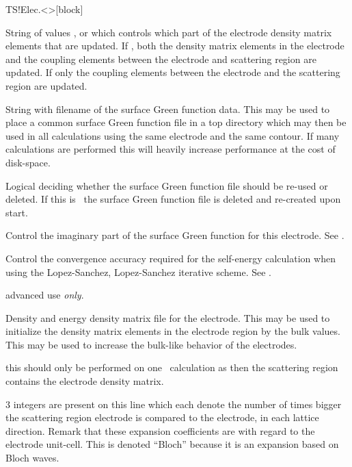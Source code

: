 \begin{fdfentry}{TS!Elec.<>}[block]
\begin{fdfoptions}
    \option[DM-update]%
    String of values ,  or 
    which controls which part of the electrode density matrix elements
    that are updated. If , both the density matrix elements
    in the electrode and the coupling elements between the 
    electrode and scattering region are updated. If 
    only the coupling elements between the electrode and the
    scattering region are updated.

    \option[Gf]%
    String with filename of the surface Green function data. This may
    be used to place a common surface Green function file in a top
    directory which may then be used in all calculations using the
    same electrode and the same contour. 
    If many calculations are performed this will heavily increase
    performance at the cost of disk-space.

    \option[Gf-Reuse]%
    Logical deciding whether the surface Green function file should be
    re-used or deleted.
    If this is \fdffalse\ the surface Green function file is deleted
    and re-created upon start.
    
    \option[Eta]%
    Control the imaginary part of the surface Green function for this
    electrode. See .

    \option[Accuracy]%
    Control the convergence accuracy required for the self-energy
    calculation when using the Lopez-Sanchez, Lopez-Sanchez iterative
    scheme. 
    See .

    \note advanced use \emph{only}.
    
    \option[DE]%
    Density and energy density matrix file for the electrode. This may
    be used to initialize the density matrix elements in the electrode
    region by the bulk values. This may be used to increase the
    bulk-like behavior of the electrodes. 

    \note this should only be performed on one \tsiesta\ calculation
    as then the scattering region  contains the
    electrode density matrix.

    \option[Bloch]%
    $3$ integers are present on this line which each denote the number
    of times bigger the scattering region electrode is compared to the
    electrode, in each lattice direction. Remark that these expansion
    coefficients are with regard to the electrode unit-cell.
    This is denoted ``Bloch'' because it is an expansion based on
    Bloch waves.


\end{fdfoptions}
\end{fdfentry}
